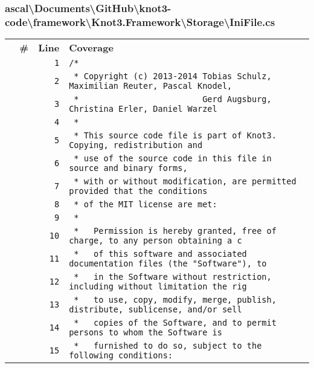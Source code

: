 \documentclass[a4paper,10pt]{article}
\begin{document}
\subsubsection{ascal\textbackslash Documents\textbackslash GitHub\textbackslash knot3-code\textbackslash framework\textbackslash Knot3.Framework\textbackslash Storage\textbackslash IniFile.cs}
\begin{longtable}[l]{lrrl}
\textbf{} & \textbf{\#} & \textbf{Line} & \textbf{Coverage}\\
\cellcolor{gray} &  & \verb~1~ & \verb~/*~\\
\cellcolor{gray} &  & \verb~2~ & \verb~ * Copyright (c) 2013-2014 Tobias Schulz, Maximilian Reuter, Pascal Knodel,~\\
\cellcolor{gray} &  & \verb~3~ & \verb~ *                         Gerd Augsburg, Christina Erler, Daniel Warzel~\\
\cellcolor{gray} &  & \verb~4~ & \verb~ *~\\
\cellcolor{gray} &  & \verb~5~ & \verb~ * This source code file is part of Knot3. Copying, redistribution and~\\
\cellcolor{gray} &  & \verb~6~ & \verb~ * use of the source code in this file in source and binary forms,~\\
\cellcolor{gray} &  & \verb~7~ & \verb~ * with or without modification, are permitted provided that the conditions~\\
\cellcolor{gray} &  & \verb~8~ & \verb~ * of the MIT license are met:~\\
\cellcolor{gray} &  & \verb~9~ & \verb~ *~\\
\cellcolor{gray} &  & \verb~10~ & \verb~ *   Permission is hereby granted, free of charge, to any person obtaining a c~\\
\cellcolor{gray} &  & \verb~11~ & \verb~ *   of this software and associated documentation files (the "Software"), to ~\\
\cellcolor{gray} &  & \verb~12~ & \verb~ *   in the Software without restriction, including without limitation the rig~\\
\cellcolor{gray} &  & \verb~13~ & \verb~ *   to use, copy, modify, merge, publish, distribute, sublicense, and/or sell~\\
\cellcolor{gray} &  & \verb~14~ & \verb~ *   copies of the Software, and to permit persons to whom the Software is~\\
\cellcolor{gray} &  & \verb~15~ & \verb~ *   furnished to do so, subject to the following conditions:~\\

\end{longtable}
\end{document}
